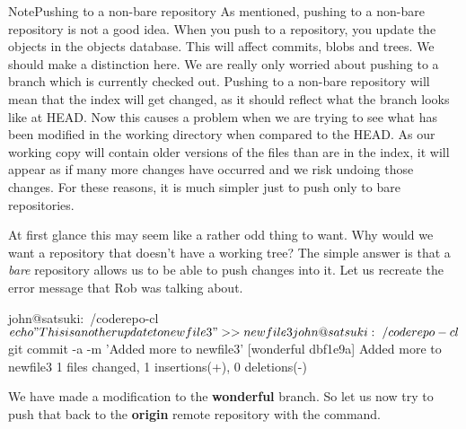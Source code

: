 \begin{callout}{Note}{Pushing to a non-bare repository}
As mentioned, pushing to a non-bare repository is not a good idea.
When you push to a repository, you update the objects in the objects database.
This will affect commits, blobs and trees.
We should make a distinction here.
We are really only worried about pushing to a branch which is currently checked out.
Pushing to a non-bare repository will mean that the index will get changed, as it should reflect what the branch looks like at HEAD.
\newline
\newline
Now this causes a problem when we are trying to see what has been modified in the working directory when compared to the HEAD.
As our working copy will contain older versions of the files than are in the index, it will appear as if many more changes have occurred and we risk undoing those changes.
For these reasons, it is much simpler just to push only to bare repositories.
\end{callout}

At first glance this may seem like a rather odd thing to want.
Why would we want a repository that doesn't have a working tree? The simple answer is that a \emph{bare} repository allows us to be able to push changes into it.
Let us recreate the error message that Rob was talking about.

\begin{code}
john@satsuki:~/coderepo-cl$ echo "This is another update to newfile3" >> newfile3
john@satsuki:~/coderepo-cl$ git commit -a -m 'Added more to newfile3'
[wonderful dbf1e9a] Added more to newfile3
 1 files changed, 1 insertions(+), 0 deletions(-)
\end{code}

We have made a modification to the \textbf{wonderful} branch.
So let us now try to push that back to the \textbf{origin} remote repository with the  command.

